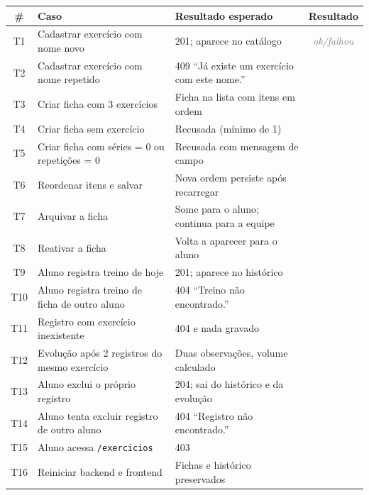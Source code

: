 \documentclass[11pt,a4paper,final]{article}
\newcommand{\cod}[1]{\texttt{#1}}
\newcommand{\preencher}[1]{\textit{\textcolor{gray}{#1}}}
\begin{document}
\begin{xltabular}{\textwidth}{c Y Y c}
  \toprule
  \textbf{\#} & \textbf{Caso} & \textbf{Resultado esperado} & \textbf{Resultado} \\
  \midrule
  \endhead
  T1  & Cadastrar exercício com nome novo                       & 201; aparece no catálogo                       & \preencher{ok/falhou} \\
  T2  & Cadastrar exercício com nome repetido                   & 409 ``Já existe um exercício com este nome.''  & \preencher{} \\
  T3  & Criar ficha com 3 exercícios                            & Ficha na lista com itens em ordem              & \preencher{} \\
  T4  & Criar ficha sem exercício                               & Recusada (mínimo de 1)                          & \preencher{} \\
  T5  & Criar ficha com séries = 0 ou repetições = 0            & Recusada com mensagem de campo                  & \preencher{} \\
  T6  & Reordenar itens e salvar                                & Nova ordem persiste após recarregar             & \preencher{} \\
  T7  & Arquivar a ficha                                        & Some para o aluno; continua para a equipe       & \preencher{} \\
  T8  & Reativar a ficha                                        & Volta a aparecer para o aluno                   & \preencher{} \\
  T9  & Aluno registra treino de hoje                           & 201; aparece no histórico                       & \preencher{} \\
  T10 & Aluno registra treino de ficha de outro aluno           & 404 ``Treino não encontrado.''                  & \preencher{} \\
  T11 & Registro com exercício inexistente                      & 404 e nada gravado                              & \preencher{} \\
  T12 & Evolução após 2 registros do mesmo exercício            & Duas observações, volume calculado              & \preencher{} \\
  T13 & Aluno exclui o próprio registro                         & 204; sai do histórico e da evolução             & \preencher{} \\
  T14 & Aluno tenta excluir registro de outro aluno             & 404 ``Registro não encontrado.''                & \preencher{} \\
  T15 & Aluno acessa \cod{/exercicios}                          & 403                                             & \preencher{} \\
  T16 & Reiniciar backend e frontend                            & Fichas e histórico preservados                  & \preencher{} \\
  \bottomrule
\end{xltabular}
\end{document}
